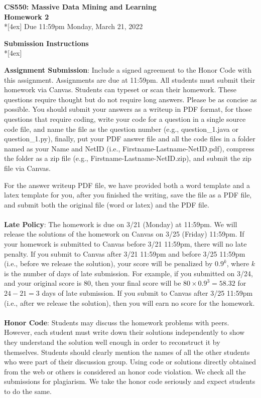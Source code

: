 \documentclass[11pt]{article}
\begin{document}
\thispagestyle{empty}
\parindent 0pt
\vfill
\large

\begin{center}
\LARGE{\bf \textsf{CS550: Massive Data Mining and Learning}}\\ {\bf \textsf{Homework 2}} 
\\*[4ex]
Due 11:59pm Monday, March 21, 2022
\end{center}

\pagebreak[4]
\begin{center}
\LARGE{\bf \textsf{Submission Instructions}} \\*[4ex]
\end{center}

\textbf{Assignment Submission}: Include a signed agreement to the Honor Code with this assignment. Assignments are due at 11:59pm. All students must submit their homework via Canvas. Students can typeset or scan their homework. These questions require thought but do not require long answers.  Please be as concise as possible. You should submit your answers as a writeup in PDF format, for those questions that require coding, write your code for a question in a single source code file, and name the file as the question number (e.g., question\_1.java or question\_1.py), finally, put your PDF answer file and all the code files in a folder named as your Name and NetID (i.e., Firstname-Lastname-NetID.pdf), compress the folder as a zip file (e.g., Firstname-Lastname-NetID.zip), and submit the zip file via Canvas.

For the answer writeup PDF file, we have provided both a word template and a latex template for you, after you finished the writing, save the file as a PDF file, and submit both the original file (word or latex) and the PDF file.
\\
\\
\textbf{Late Policy}: The homework is due on 3/21 (Monday) at 11:59pm. We will release the solutions of the homework on Canvas on 3/25 (Friday) 11:59pm. If your homework is submitted to Canvas before 3/21 11:59pm, there will no late penalty. If you submit to Canvas after 3/21 11:59pm and before 3/25 11:59pm (i.e., before we release the solution), your score will be penalized by $0.9^k$, where $k$ is the number of days of late submission. For example, if you submitted on 3/24, and your original score is 80, then your final score will be $80\times 0.9^3=58.32$ for $24-21=3$ days of late submission. If you submit to Canvas after 3/25 11:59pm (i.e., after we release the solution), then you will earn no score for the homework.
\\
\\
\textbf{Honor Code}: Students may discuss the homework problems with peers. However, each student must write down their solutions independently to show they understand the solution well enough in order to reconstruct it by themselves.  Students should clearly mention the names of all the other students who were part of their discussion group. Using code or solutions directly obtained from the web or others is considered an honor code violation. We check all the submissions for plagiarism. We take the honor code seriously and expect students to do the same. 
\\
\vfill
\end{document}
